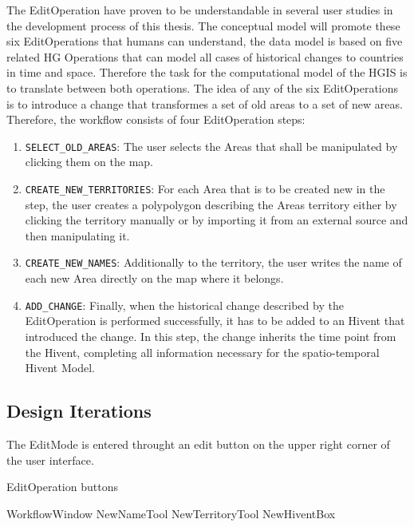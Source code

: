 The EditOperation have proven to be understandable in several user studies in the development process of this thesis. The conceptual model will promote these six EditOperations that humans can understand, the data model is based on five related HG Operations that can model all cases of historical changes to countries in time and space. Therefore the task for the computational model of the HGIS is to translate between both operations. The idea of any of the six EditOperations is to introduce a change that transformes a set of old areas to a set of new areas. Therefore, the workflow consists of four EditOperation steps:
\begin{enumerate}
  \item \texttt{SELECT\_OLD\_AREAS}: The user selects the Areas that shall be manipulated by clicking them on the map.
  \item \texttt{CREATE\_NEW\_TERRITORIES}: For each Area that is to be created new in the step, the user creates a polypolygon describing the Areas territory either by clicking the territory manually or by importing it from an external source and then manipulating it.
  \item \texttt{CREATE\_NEW\_NAMES}: Additionally to the territory, the user writes the name of each new Area directly on the map where it belongs.
  \item \texttt{ADD\_CHANGE}: Finally, when the historical change described by the EditOperation is performed successfully, it has to be added to an Hivent that introduced the change. In this step, the change inherits the time point from the Hivent, completing all information necessary for the spatio-temporal Hivent Model.
\end{enumerate}



\subsection{Design Iterations} %
\label{sub:design_iterations}

The EditMode is entered throught an edit button on the upper right corner of the user interface.

EditOperation buttons

WorkflowWindow
NewNameTool
NewTerritoryTool
NewHiventBox

